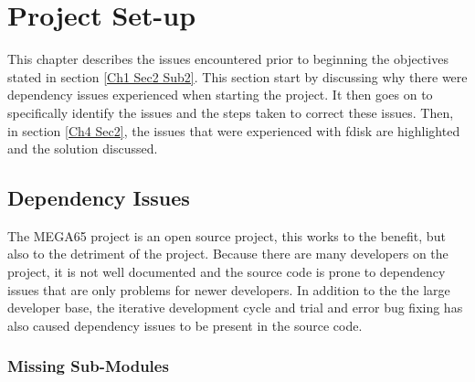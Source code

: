 
\chapter{Project Set-up} %

\label{Chapter 4} %

This chapter describes the issues encountered prior to beginning the objectives stated in section \ref{Ch1 Sec2 Sub2}. This section start by discussing why there were dependency issues experienced when starting the project. It then goes on to specifically identify the issues and the steps taken to correct these issues. Then, in section \ref{Ch4 Sec2}, the issues that were experienced with fdisk are highlighted and the solution discussed. 


\section{Dependency Issues}

\label{Ch4 Sec1}

The MEGA65 project is an open source project, this works to the benefit, but also to the detriment of the project. Because there are many developers on the project, it is not well documented and the source code is prone to dependency issues that are only problems for newer developers. In addition to the the large developer base, the iterative development cycle and trial and error bug fixing has also caused dependency issues to be present in the source code.

\subsection{Missing Sub-Modules}

\label{Ch4 Sec1 Sub1}

